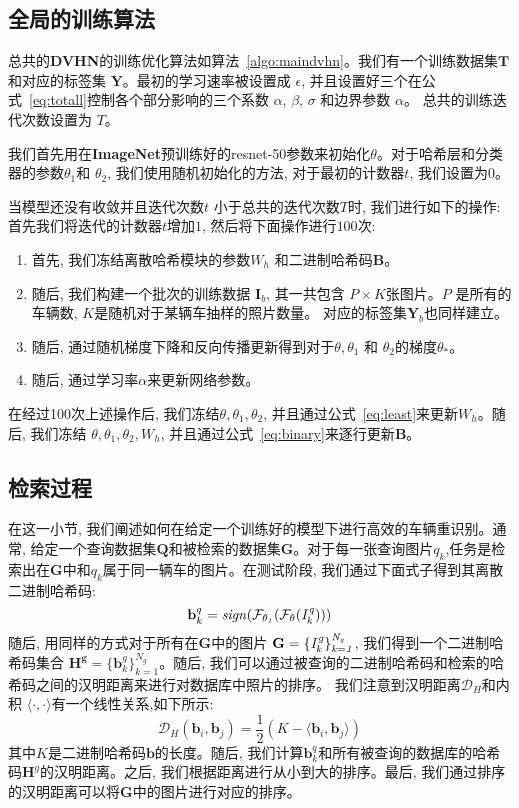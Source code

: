 \subsection{全局的训练算法}
总共的\textbf{DVHN}的训练优化算法如算法~\ref{algo:maindvhn}。我们有一个训练数据集$\mathbf{T}$和对应的标签集 $\mathbf{Y}$。最初的学习速率被设置成 $\epsilon$, 并且设置好三个在公式~\ref{eq:totall}控制各个部分影响的三个系数 $\alpha$, $\beta$, $\sigma$ 和边界参数 $\alpha$。 总共的训练迭代次数设置为 $T$。 \par
我们首先用在\textbf{ImageNet}预训练好的resnet-50参数来初始化$\theta$。对于哈希层和分类器的参数$\theta_1$和 $\theta_2$, 我们使用随机初始化的方法, 对于最初的计数器$t$, 我们设置为$0$。 \par
当模型还没有收敛并且迭代次数$t$ 小于总共的迭代次数$T$时, 我们进行如下的操作: 首先我们将迭代的计数器$t$增加$1$, 然后将下面操作进行$100$次:
\begin{enumerate}
    \item 首先, 我们冻结离散哈希模块的参数$W_h$ 和二进制哈希码$\mathbf{B}$。
    \item 随后, 我们构建一个批次的训练数据 $\mathbf{I}_b$, 其一共包含 $P \times K$张图片。$P$ 是所有的车辆数, $K$是随机对于某辆车抽样的照片数量。 对应的标签集$\mathbf{Y}_b$也同样建立。
    \item 随后, 通过随机梯度下降和反向传播更新得到对于$\theta, \theta_1$ 和 $\theta_2$的梯度$\theta_*$。
    \item 随后, 通过学习率$\alpha$来更新网络参数。
\end{enumerate}
在经过100次上述操作后, 我们冻结$\theta, \theta_1, \theta_2$, 并且通过公式~\ref{eq:least}来更新$W_h$。随后, 我们冻结 $\theta, \theta_1, \theta_2, W_h$, 并且通过公式~\ref{eq:binary}来逐行更新$\mathbf{B}$。

\subsection{检索过程}
在这一小节, 我们阐述如何在给定一个训练好的模型下进行高效的车辆重识别。通常, 给定一个查询数据集$\mathbf{Q}$和被检索的数据集$\mathbf{G}$。对于每一张查询图片$q_k$,任务是检索出在$\mathbf{G}$中和$q_k$属于同一辆车的图片。在测试阶段, 我们通过下面式子得到其离散二进制哈希码:
\begin{equation}
    \mathbf{b}_k^q = \mathbf{\it{sign}(\mathcal{F}_{\theta_1}(\mathcal{F}_{\theta}(\it{I}^q_k)))}
\end{equation}
随后, 用同样的方式对于所有在$\mathbf{G}$中的图片 $\mathbf{G} = \{\it{I}^g_k\}_{k=1}^{N_g} $, 我们得到一个二进制哈希码集合  $\mathbf{H^g} = \{\mathbf{b}_k^g\}_{k=1}^{N_g}$。随后, 我们可以通过被查询的二进制哈希码和检索的哈希码之间的汉明距离来进行对数据库中照片的排序。 我们注意到汉明距离$\mathcal{D}_H$和内积 $\langle\cdot, \cdot \rangle$有一个线性关系,如下所示:
\begin{equation}
    \mathcal{D}_H(\mathbf{b}_i,\mathbf{b}_j) = \frac{1}{2}(K - \langle \mathbf{b}_i, \mathbf{b}_j \rangle)
\end{equation}
其中$K$是二进制哈希码$\mathbf{b}$的长度。随后, 我们计算$\mathbf{b}_k^q$和所有被查询的数据库的哈希码$\mathbf{H}^g$的汉明距离。之后, 我们根据距离进行从小到大的排序。最后, 我们通过排序的汉明距离可以将$\mathbf{G}$中的图片进行对应的排序。

